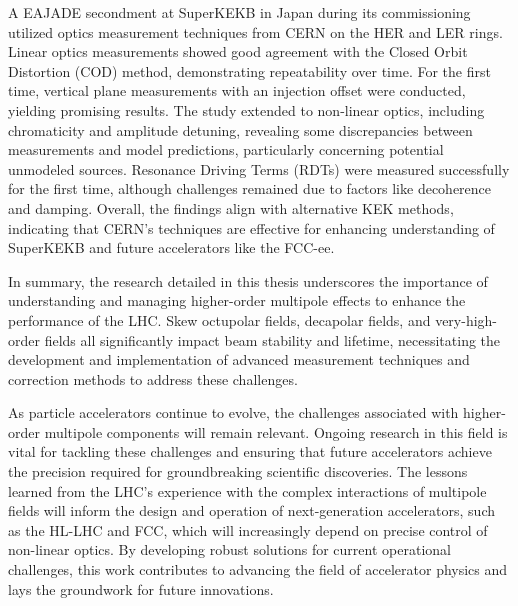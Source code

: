 \documentclass{article}
\begin{document}
A EAJADE secondment at SuperKEKB in Japan during its commissioning utilized optics
measurement techniques from CERN on the HER and LER rings. Linear optics measurements showed good
agreement with the Closed Orbit Distortion (COD) method, demonstrating repeatability over time. For
the first time, vertical plane measurements with an injection offset were conducted, yielding
promising results. The study extended to non-linear optics, including chromaticity and amplitude
detuning, revealing some discrepancies between measurements and model predictions, particularly
concerning potential unmodeled sources. Resonance Driving Terms (RDTs) were measured successfully
for the first time, although challenges remained due to factors like decoherence and damping.
Overall, the findings align with alternative KEK methods, indicating that CERN's techniques are
effective for enhancing understanding of SuperKEKB and future accelerators like the FCC-ee.

In summary, the research detailed in this thesis underscores the importance of
understanding and managing higher-order multipole effects to enhance the performance of the LHC.
Skew octupolar fields, decapolar fields, and very-high-order fields all significantly impact beam
stability and lifetime, necessitating the development and implementation of advanced measurement
techniques and correction methods to address these challenges.

As particle accelerators continue to evolve, the challenges associated with higher-order multipole
components will remain relevant. Ongoing research in this field is vital for tackling these
challenges and ensuring that future accelerators achieve the precision required for groundbreaking
scientific discoveries. The lessons learned from the LHC's experience with the complex interactions
of multipole fields will inform the design and operation of next-generation accelerators, such as
the HL-LHC and FCC, which will increasingly depend on precise control of non-linear optics. By
developing robust solutions for current operational challenges, this work contributes to advancing
the field of accelerator physics and lays the groundwork for future innovations.
\end{document}
